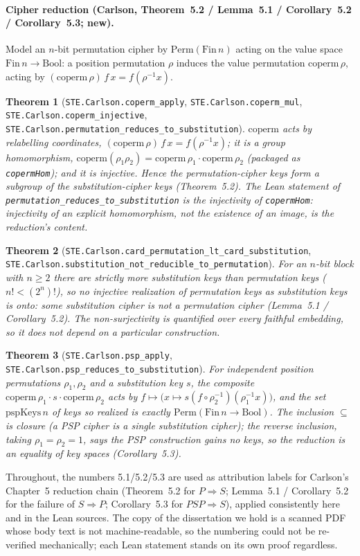 \documentclass[11pt]{article}
\newtheorem{theorem}{Theorem}
\begin{document}
\paragraph{Cipher reduction (Carlson, Theorem~5.2 / Lemma~5.1 /
Corollary~5.2 / Corollary~5.3; new).}
Model an $n$-bit permutation cipher by $\mathrm{Perm}(\mathrm{Fin}\,n)$
acting on the value space $\mathrm{Fin}\,n\to\mathrm{Bool}$: a position
permutation $\rho$ induces the value permutation
$\mathrm{coperm}\,\rho$, acting by
$(\mathrm{coperm}\,\rho)\,f\,x=f(\rho^{-1}x)$.
\begin{theorem}[\texttt{STE.Carlson.coperm\_apply},
\texttt{STE.Carlson.coperm\_mul},
\texttt{STE.Carlson.coperm\_injective},
\texttt{STE.Carlson.permutation\_reduces\_to\_substitution}]
$\mathrm{coperm}$ acts by relabelling coordinates,
$(\mathrm{coperm}\,\rho)\,f\,x=f(\rho^{-1}x)$; it is a group
homomorphism, $\mathrm{coperm}(\rho_1\rho_2)=
\mathrm{coperm}\,\rho_1\cdot\mathrm{coperm}\,\rho_2$ (packaged as
\texttt{copermHom}); and it is \emph{injective}. Hence the
permutation-cipher keys form a subgroup of the substitution-cipher keys
(Theorem~5.2). The Lean statement of
\texttt{permutation\_reduces\_to\_substitution} is the injectivity of
\texttt{copermHom}: injectivity of an explicit homomorphism, not the
existence of an image, is the reduction's content.
\end{theorem}
\begin{theorem}[\texttt{STE.Carlson.card\_permutation\_lt\_card\_substitution},
\texttt{STE.Carlson.substitution\_not\_reducible\_to\_permutation}]
For an $n$-bit block with $n\ge 2$ there are strictly more substitution
keys than permutation keys ($n! < (2^n)!$), so \emph{no} injective
realization of permutation keys as substitution keys is onto: some
substitution cipher is not a permutation cipher (Lemma~5.1 /
Corollary~5.2). The non-surjectivity is quantified over every faithful
embedding, so it does not depend on a particular construction.
\end{theorem}
\begin{theorem}[\texttt{STE.Carlson.psp\_apply},
\texttt{STE.Carlson.psp\_reduces\_to\_substitution}]
For \emph{independent} position permutations $\rho_1,\rho_2$ and a
substitution key $s$, the composite
$\mathrm{coperm}\,\rho_1\cdot s\cdot\mathrm{coperm}\,\rho_2$ acts by
$f\mapsto \bigl(x\mapsto s(f\circ\rho_2^{-1})(\rho_1^{-1}x)\bigr)$, and
the set $\mathrm{pspKeys}\,n$ of keys so realized is \emph{exactly}
$\mathrm{Perm}(\mathrm{Fin}\,n\to\mathrm{Bool})$. The inclusion
$\subseteq$ is closure (a PSP cipher is a single substitution cipher);
the reverse inclusion, taking $\rho_1=\rho_2=1$, says the PSP
construction gains no keys, so the reduction is an equality of key
spaces (Corollary~5.3).
\end{theorem}
\noindent Throughout, the numbers 5.1/5.2/5.3 are used as attribution
labels for Carlson's Chapter~5 reduction chain (Theorem~5.2 for
$P\Rightarrow S$; Lemma~5.1 / Corollary~5.2 for the failure of
$S\Rightarrow P$; Corollary~5.3 for $PSP\Rightarrow S$), applied
consistently here and in the Lean sources. The copy of the dissertation
we hold is a scanned PDF whose body text is not machine-readable, so the
numbering could not be re-verified mechanically; each Lean statement
stands on its own proof regardless.
\end{document}
